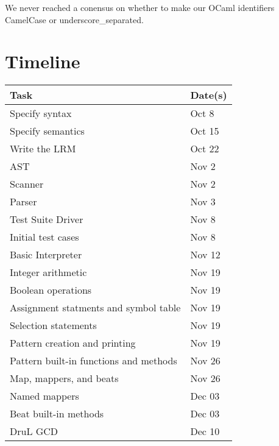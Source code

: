 We never reached a conensus on whether to make our OCaml identifiers CamelCase or underscore\_separated.

\section{Timeline}

\begin{tabular}{ | l | l | } \hline
	\textbf{Task}                          & \textbf{Date(s)}\\ \hline\hline
	Specify syntax                         & Oct  8          \\ \hline
	Specify semantics                      & Oct 15          \\ \hline
	Write the LRM                          & Oct 22          \\ \hline
	AST                                    & Nov  2          \\ \hline
	Scanner                                & Nov  2          \\ \hline
	Parser                                 & Nov  3          \\ \hline
	Test Suite Driver                      & Nov  8          \\ \hline
	Initial test cases                     & Nov  8          \\ \hline
	Basic Interpreter                      & Nov 12          \\ \hline
	Integer arithmetic                     & Nov 19          \\ \hline
	Boolean operations                     & Nov 19          \\ \hline
	Assignment statments and symbol table  & Nov 19          \\ \hline
	Selection statements                   & Nov 19          \\ \hline
	Pattern creation and printing          & Nov 19          \\ \hline
	Pattern built-in functions and methods & Nov 26          \\ \hline
	Map, mappers, and beats                & Nov 26          \\ \hline
	Named mappers                          & Dec 03          \\ \hline
	Beat built-in methods                  & Dec 03          \\ \hline
	DruL GCD                               & Dec 10          \\ \hline

\end{tabular}
